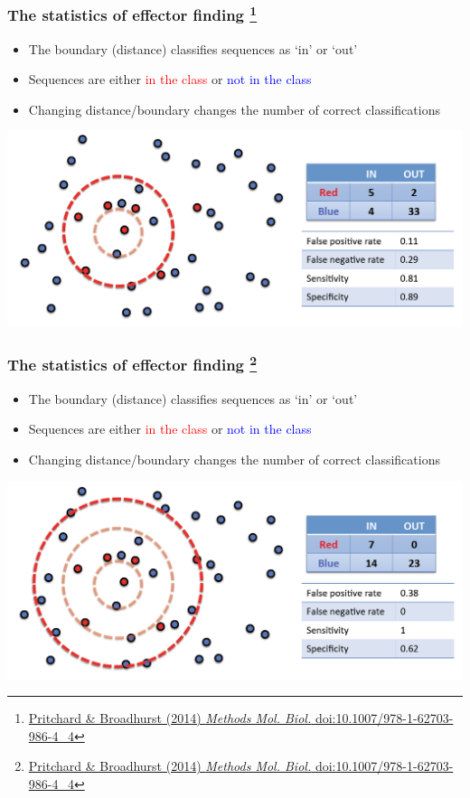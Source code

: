 \begin{frame}
  \frametitle{The statistics of effector finding
  \footnote{\tiny{\href{http://dx.doi.org/10.1007/978-1-62703-986-4_4}{Pritchard \& Broadhurst (2014) \textit{Methods Mol. Biol.} doi:10.1007/978-1-62703-986-4\_4}}}
}
  \begin{itemize}
    \item \textcolor{hutton_green}{The boundary (distance) classifies sequences as `in' or `out'}
    \item Sequences are either \textcolor{red}{in the class} or \textcolor{blue}{not in the class}
    \item \textcolor{hutton_purple}{Changing distance/boundary changes the number of correct classifications}
  \end{itemize}
  \includegraphics[width=1\textwidth]{images/finding_effectors9}    
\end{frame}

\begin{frame}
  \frametitle{The statistics of effector finding
  \footnote{\tiny{\href{http://dx.doi.org/10.1007/978-1-62703-986-4_4}{Pritchard \& Broadhurst (2014) \textit{Methods Mol. Biol.} doi:10.1007/978-1-62703-986-4\_4}}}
}
  \begin{itemize}
    \item \textcolor{hutton_green}{The boundary (distance) classifies sequences as `in' or `out'}
    \item Sequences are either \textcolor{red}{in the class} or \textcolor{blue}{not in the class}
    \item \textcolor{hutton_purple}{Changing distance/boundary changes the number of correct classifications}
  \end{itemize}
  \includegraphics[width=1\textwidth]{images/finding_effectors10}    
\end{frame}

